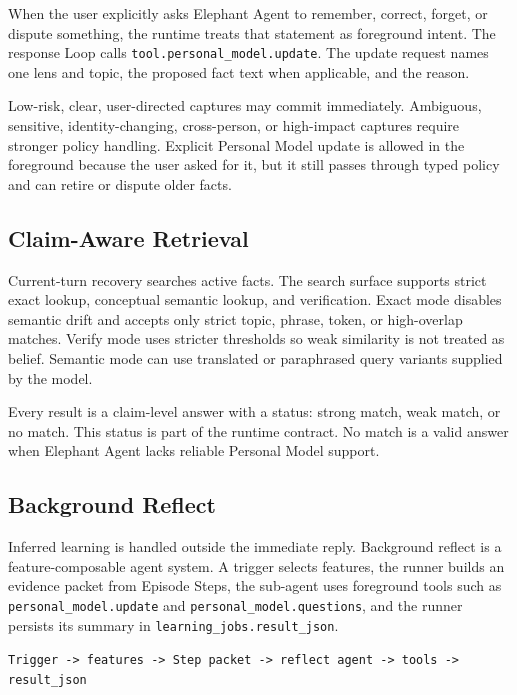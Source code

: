 When the user explicitly asks Elephant Agent to remember, correct, forget, or dispute
something, the runtime treats that statement as foreground intent. The response
Loop calls \texttt{tool.personal\_model.update}. The update request names one
lens and topic, the proposed fact text when applicable, and the reason.

Low-risk, clear, user-directed captures may commit immediately. Ambiguous,
sensitive, identity-changing, cross-person, or high-impact captures require
stronger policy handling. Explicit Personal Model update is allowed in the
foreground because the user asked for it, but it still passes through typed
policy and can retire or dispute older facts.

\subsection{Claim-Aware Retrieval}

Current-turn recovery searches active facts. The search surface supports strict
exact lookup, conceptual semantic lookup, and verification. Exact mode disables
semantic drift and accepts only strict topic, phrase, token, or high-overlap
matches. Verify mode uses stricter
thresholds so weak similarity is not treated as belief. Semantic mode can use
translated or paraphrased query variants supplied by the model.

Every result is a claim-level answer with a status: strong match, weak match,
or no match. This status is part of the runtime contract. No match is a valid
answer when Elephant Agent lacks reliable Personal Model support.

\subsection{Background Reflect}

Inferred learning is handled outside the immediate reply. Background reflect is
a feature-composable agent system. A trigger selects features, the runner
builds an evidence packet from Episode Steps, the sub-agent uses foreground
tools such as \texttt{personal\_model.update} and
\texttt{personal\_model.questions}, and the runner persists its summary in
\texttt{learning\_jobs.result\_json}.

\begin{center}
\texttt{Trigger -> features -> Step packet -> reflect agent -> tools -> result\_json}
\end{center}

